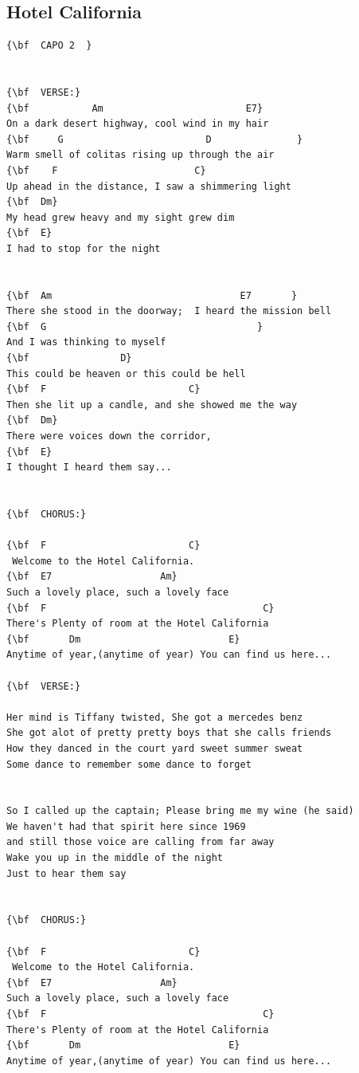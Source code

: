 \documentclass[a4paper]{article}
\begin{document}
\subsection{Hotel California}
\begin{Verbatim}[commandchars=\\\{\}]
{\bf  CAPO 2  }


{\bf  VERSE:}
{\bf           Am                         E7}
On a dark desert highway, cool wind in my hair
{\bf     G                         D               }
Warm smell of colitas rising up through the air
{\bf    F                        C}
Up ahead in the distance, I saw a shimmering light
{\bf  Dm}
My head grew heavy and my sight grew dim
{\bf  E}
I had to stop for the night


{\bf  Am                                 E7       }
There she stood in the doorway;  I heard the mission bell
{\bf  G                                     }
And I was thinking to myself 
{\bf                D}
This could be heaven or this could be hell
{\bf  F                         C}
Then she lit up a candle, and she showed me the way
{\bf  Dm}
There were voices down the corridor, 
{\bf  E}
I thought I heard them say...


{\bf  CHORUS:}

{\bf  F                         C}
 Welcome to the Hotel California.
{\bf  E7                   Am}
Such a lovely place, such a lovely face
{\bf  F                                      C}
There's Plenty of room at the Hotel California
{\bf       Dm                          E}
Anytime of year,(anytime of year) You can find us here...

{\bf  VERSE:}

Her mind is Tiffany twisted, She got a mercedes benz
She got alot of pretty pretty boys that she calls friends
How they danced in the court yard sweet summer sweat
Some dance to remember some dance to forget


So I called up the captain; Please bring me my wine (he said)
We haven't had that spirit here since 1969
and still those voice are calling from far away
Wake you up in the middle of the night 
Just to hear them say


{\bf  CHORUS:}

{\bf  F                         C}
 Welcome to the Hotel California.
{\bf  E7                   Am}
Such a lovely place, such a lovely face
{\bf  F                                      C}
There's Plenty of room at the Hotel California
{\bf       Dm                          E}
Anytime of year,(anytime of year) You can find us here...


\end{Verbatim}
\end{document}

